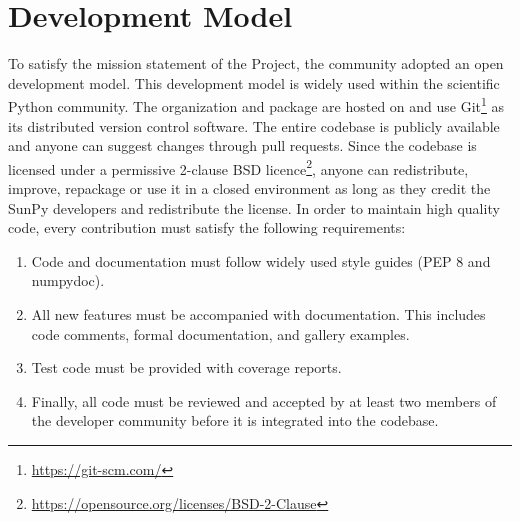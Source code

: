 \section{Development Model}

To satisfy the mission statement of the Project, the \sunpy community adopted an open development model. 
This development model is widely used within the scientific Python community. 
The \sunpy organization and \sunpypkg package are hosted on \github and use Git\footnote{\url{https://git-scm.com/}} as its distributed version control software.
The entire codebase is publicly available and anyone can suggest changes through pull requests. 
Since the codebase is licensed under a permissive 2-clause BSD licence\footnote{\url{https://opensource.org/licenses/BSD-2-Clause}}, anyone can redistribute, improve, repackage or use it in a closed environment as long as they credit the SunPy developers and redistribute the license. 
In order to maintain high quality code, every contribution must satisfy the following requirements:
\begin{enumerate}
    \item Code and documentation must follow widely used style guides (PEP 8 and numpydoc).
    \item All new features must be accompanied with documentation. 
    This includes code comments, formal documentation, and gallery examples.
    \item Test code must be provided with coverage reports.
    \item Finally, all code must be reviewed and accepted by at least two members of the developer community before it is integrated into the codebase.
\end{enumerate}

